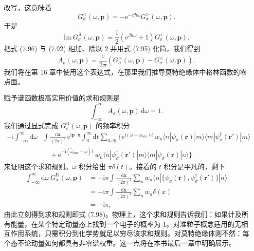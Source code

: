 改写，这意味着
\begin{equation*}
G_{\sigma}^{<}(\omega,\mathbf{p})=-\mathrm{e}^{-\beta\hbar\omega}G_{\sigma}^{>}(\omega,\mathbf{p}).\tag{7.95}
\end{equation*}
于是
\begin{equation*}
\mathrm{Im}\,G_{\sigma}^{\mathrm{R}}(\omega,\mathbf{p})=\frac{\mathrm{i}}{2}\left(\mathrm{e}^{\beta\hbar\omega}+1\right)G_{\sigma}^{<}(\omega,\mathbf{p}).\tag{7.96}
\end{equation*}
把式 (7.96) 与 (7.92) 相加、除以 2 并用式 (7.95) 化简，我们得到
\begin{equation*}
A_{\sigma}(\omega,\mathbf{p})=\frac{\mathrm{i}}{2\pi}\left(G_{\sigma}^{>}(\omega,\mathbf{p})-G_{\sigma}^{<}(\omega,\mathbf{p})\right).\tag{7.97}
\end{equation*}
我们将在第 16 章中使用这个表达式，在那里我们推导莫特绝缘体中格林函数的零点面。

赋予谱函数极高实用价值的求和规则是
\begin{equation*}
\int_{-\infty}^{\infty}A_{\sigma}(\omega,\mathbf{p})\,\mathrm{d}\omega=1.\tag{7.98}
\end{equation*}
我们通过显式完成 $G_{\sigma}^{\mathrm{R}}(\omega,\mathbf{p})$ 的频率积分
\begin{equation*}
\begin{aligned}
-\mathrm{i}\int_{-\infty}^{\infty}\mathrm{d}\omega&\int\frac{\mathrm{d}\mathbf{x}}{(2\pi)^{3}}\,\mathrm{e}^{\mathrm{i}\mathbf{p}\cdot\mathbf{x}}\int_{0}^{\infty}\mathrm{d}t\sum_{n,m}\Big\{\mathrm{e}^{\mathrm{i}(\omega+\omega_{nm})t}\,w_{n}\langle n|\psi_{\sigma}(\mathbf{r})|m\rangle\langle m|\psi_{\sigma}^{\dagger}(\mathbf{r}')|m\rangle\\
&\quad+\mathrm{e}^{-\mathrm{i}(\tilde{\omega}_{nm}-\omega)t}\,w_{n}\langle n|\psi_{\sigma}^{\dagger}(\mathbf{r}')|m\rangle\langle m|\psi_{\sigma}(\mathbf{r})|n\rangle\Big\}
\end{aligned}\tag{7.99}
\end{equation*}
来证明这个求和规则。$\omega$ 积分给出 $\pi\delta(t)$。接着的 $t$ 积分是平凡的，剩下
\begin{equation*}
\begin{aligned}
\int_{-\infty}^{\infty}\mathrm{d}\omega\,G_{\sigma}^{\mathrm{R}}(\omega,\mathbf{p})&=-\mathrm{i}\pi\int\frac{\mathrm{d}\mathbf{x}}{(2\pi)^{3}}\sum_{n}w_{n}\langle n|\{\psi_{\sigma}(\mathbf{r}),\psi_{\sigma}^{\dagger}(\mathbf{r}')\}|n\rangle\\
&=-\mathrm{i}\pi\int\frac{\mathrm{d}\mathbf{x}}{(2\pi)^{3}}\sum_{n}w_{n}\delta(x)\\
&=-\mathrm{i}\pi,
\end{aligned}\tag{7.100}
\end{equation*}
由此立刻得到求和规则即式 (7.98)。物理上，这个求和规则告诉我们：如果计及所有能量，在某个特定动量态上找到一个电子的概率为 1。对准粒子概念适用的无相互作用系统，只需积分到化学势就足以穷尽该求和规则。对莫特绝缘体则不然：每个态不论动量如何都具有非零谱权重。这一点将在本书最后一章中明确展示。

